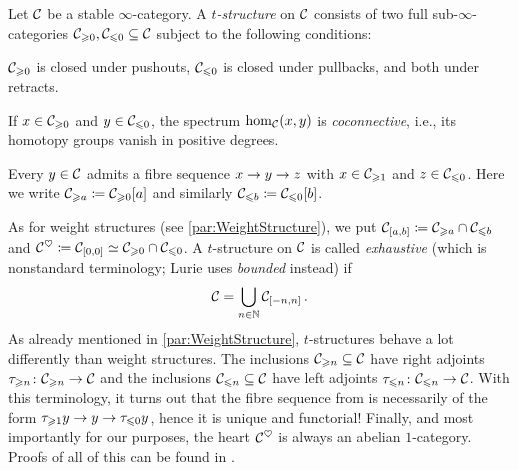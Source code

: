 \documentclass[a4paper, 10pt, oneside, DIV=9, chapterprefix=true, numbers=enddot,bibliography=totoc]{scrbook}
\begin{document}
\label{par:tStructure}
Let $\mathcal{C}$ be a stable $\infty$-category. A \emph{$t$-structure} on $\mathcal{C}$ consists of two full sub-$\infty$-categories $\mathcal{C}_{\geqslant 0},\mathcal{C}_{\leqslant 0}\subseteq \mathcal{C}$ subject to the following conditions:
\begin{alphanumerate}
	\item $\mathcal{C}_{\geqslant 0}$ is closed under pushouts, $\mathcal{C}_{\leqslant 0}$ is closed under pullbacks, and both under retracts.
	\item If $x\in \mathcal{C}_{\geqslant 0}$ and $y\in \mathcal{C}_{\leqslant 0}$, the spectrum $\hom_{\mathcal{C}}(x,y)$ is \emph{coconnective}, i.e., its homotopy groups vanish in positive degrees.
	\item Every $y\in \mathcal{C}$ admits a fibre sequence $x\morphism y \morphism z$ with $x\in \mathcal{C}_{\geqslant 1}$ and $z\in \mathcal{C}_{\leqslant 0}$. Here we write $\mathcal{C}_{\geqslant a}\coloneqq \mathcal{C}_{\geqslant 0}[a]$ and similarly $\mathcal{C}_{\leqslant b}\coloneqq \mathcal{C}_{\leqslant 0}[b]$.
\end{alphanumerate}
As for weight structures (see \cref{par:WeightStructure}), we put $\mathcal{C}_{[a,b]}\coloneqq \mathcal{C}_{\geqslant a}\cap \mathcal{C}_{\leqslant b}$ and $\mathcal{C}^\heartsuit\coloneqq \mathcal{C}_{[0,0]}\simeq \mathcal{C}_{\geqslant 0}\cap \mathcal{C}_{\leqslant 0}$. A $t$-structure on $\mathcal{C}$ is called \emph{exhaustive} (which is nonstandard terminology; Lurie uses \emph{bounded} instead) if
\begin{equation*}
	\mathcal{C}=\bigcup_{n\in\mathbb{N}}\mathcal{C}_{[-n,n]}\,.
\end{equation*}
As already mentioned in \cref{par:WeightStructure}, $t$-structures behave a lot differently than weight structures. The inclusions $\mathcal{C}_{\geqslant n}\subseteq \mathcal{C}$ have right adjoints $\tau_{\geq n}\colon \Cc_{\geq n}\morphism \Cc$ and the inclusions $\mathcal{C}_{\leqslant n}\subseteq \mathcal{C}$ have left adjoints $\tau_{\leq n}\colon \Cc_{\leq n}\morphism \Cc$. With this terminology, it turns out that the fibre sequence from  is necessarily of the form $\tau_{\geq 1} y \morphism y \morphism \tau_{\leq 0}y$, hence it is unique and functorial! Finally, and most importantly for our purposes, the heart $\mathcal{C}^\heartsuit$ is always an abelian $1$-category. Proofs of all of this can be found in \cite[Subsection~1.2.1]{HA}.
\end{document}
